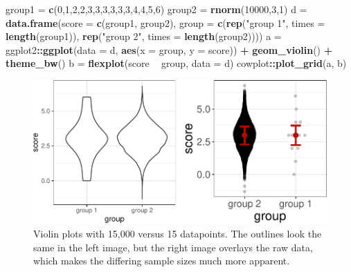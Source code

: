 \documentclass[
  man]{apa6}
\newenvironment{Shaded}{\begin{snugshade}}{\end{snugshade}}
\newcommand{\DataTypeTok}[1]{\textcolor[rgb]{0.13,0.29,0.53}{#1}}
\newcommand{\DecValTok}[1]{\textcolor[rgb]{0.00,0.00,0.81}{#1}}
\newcommand{\KeywordTok}[1]{\textcolor[rgb]{0.13,0.29,0.53}{\textbf{#1}}}
\newcommand{\NormalTok}[1]{#1}
\newcommand{\OperatorTok}[1]{\textcolor[rgb]{0.81,0.36,0.00}{\textbf{#1}}}
\newcommand{\StringTok}[1]{\textcolor[rgb]{0.31,0.60,0.02}{#1}}
\begin{document}
\begin{Shaded}
\begin{Highlighting}[]
\NormalTok{group1 =}\StringTok{ }\KeywordTok{c}\NormalTok{(}\DecValTok{0}\NormalTok{,}\DecValTok{1}\NormalTok{,}\DecValTok{2}\NormalTok{,}\DecValTok{2}\NormalTok{,}\DecValTok{3}\NormalTok{,}\DecValTok{3}\NormalTok{,}\DecValTok{3}\NormalTok{,}\DecValTok{3}\NormalTok{,}\DecValTok{3}\NormalTok{,}\DecValTok{3}\NormalTok{,}\DecValTok{4}\NormalTok{,}\DecValTok{4}\NormalTok{,}\DecValTok{5}\NormalTok{,}\DecValTok{6}\NormalTok{)}
\NormalTok{group2 =}\StringTok{ }\KeywordTok{rnorm}\NormalTok{(}\DecValTok{10000}\NormalTok{,}\DecValTok{3}\NormalTok{,}\DecValTok{1}\NormalTok{)}
\NormalTok{d =}\StringTok{ }\KeywordTok{data.frame}\NormalTok{(}\DataTypeTok{score =} \KeywordTok{c}\NormalTok{(group1, group2), }
               \DataTypeTok{group =} \KeywordTok{c}\NormalTok{(}\KeywordTok{rep}\NormalTok{(}\StringTok{"group 1"}\NormalTok{, }\DataTypeTok{times =} \KeywordTok{length}\NormalTok{(group1)), }
                       \KeywordTok{rep}\NormalTok{(}\StringTok{"group 2"}\NormalTok{, }\DataTypeTok{times =} \KeywordTok{length}\NormalTok{(group2))))}
\NormalTok{a =}\StringTok{ }\NormalTok{ggplot2}\OperatorTok{::}\KeywordTok{ggplot}\NormalTok{(}\DataTypeTok{data =}\NormalTok{ d, }\KeywordTok{aes}\NormalTok{(}\DataTypeTok{x =}\NormalTok{ group, }\DataTypeTok{y =}\NormalTok{ score)) }\OperatorTok{+}\StringTok{  }
\StringTok{  }\KeywordTok{geom_violin}\NormalTok{() }\OperatorTok{+}\StringTok{ }\KeywordTok{theme_bw}\NormalTok{()}
\NormalTok{b =}\StringTok{ }\KeywordTok{flexplot}\NormalTok{(score }\OperatorTok{~}\StringTok{ }\NormalTok{group, }\DataTypeTok{data =}\NormalTok{ d)}
\NormalTok{cowplot}\OperatorTok{::}\KeywordTok{plot_grid}\NormalTok{(a, b)}
\end{Highlighting}
\end{Shaded}

\begin{figure}

{\centering \includegraphics[width=0.9\linewidth]{flexplot_psychmeth_files/figure-latex/raw-1} 

}

\caption{Violin plots with 15,000 versus 15 datapoints. The outlines look the same in the left image, but the right image overlays the raw data, which makes the differing sample sizes much more apparent. \label{fig:raw}}\label{fig:raw}
\end{figure}
\end{document}
